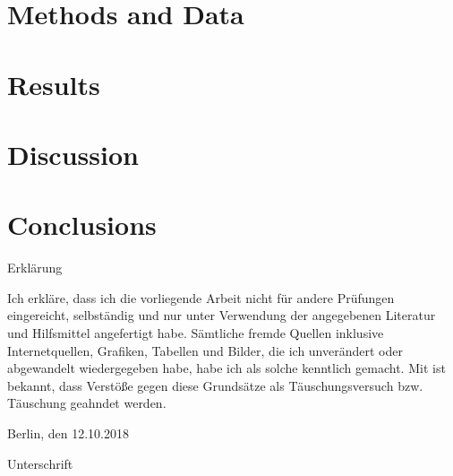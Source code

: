 \documentclass[10pt]{article}
\begin{document}
\section{Methods and Data}




\section{Results}



\section{Discussion}


\section{Conclusions}


%

\onecolumn
\newpage
Erkl\"arung

Ich erkl\"are, dass ich die vorliegende Arbeit nicht f\"ur andere Pr\"ufungen eingereicht, selbst\"andig und nur unter Verwendung der angegebenen Literatur und Hilfsmittel angefertigt habe. S\"amtliche fremde Quellen inklusive Internetquellen, Grafiken, Tabellen und Bilder, die ich unver\"andert oder abgewandelt wiedergegeben habe, habe ich als solche kenntlich gemacht. Mit ist bekannt, dass Verst\"oße gegen diese Grunds\"atze als T\"auschungsversuch bzw. T\"auschung geahndet werden.

Berlin, den 12.10.2018\\

\par\bigskip
\par\bigskip

Unterschrift
\end{document}
